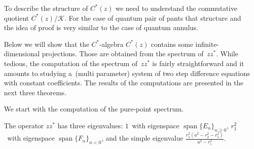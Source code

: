 To describe the structure of $C^*(z)$ we need to understand the commutative quotient $C^*(z)/\mathcal{K}$.
For the case of quantum pair of pants that structure and the idea of proof is very similar to the case of quantum
annulus.

Below we will show that the $C^*$-algebra $C^*(z)$ contains some inf\/inite-dimensional projections.
Those are obtained from the spectrum of~$zz^*$.
While tedious, the computation of the spectrum of~$zz^*$ is fairly straightforward and it amounts to studying a~(multi
parameter) system of two step dif\/ference equations with constant coef\/f\/icients.
The results of the computations are presented in the next three theorems.

We start with the computation of the pure-point spectrum.

\begin{Theorem}
\label{discspecthm}
The operator $zz^*$ has three eigenvalues: $1$~with eigenspace $\operatorname{span}\{E_n\}_{n\geq 0}$, $r_1^2$~with eigenspace
$\operatorname{span}\{F_n\}_{n< 0}$, and the simple eigenvalue $\frac{r_1^2(a^2-r_2^2-r_1^2)}{a^2-r_1^2}$.
\end{Theorem}

